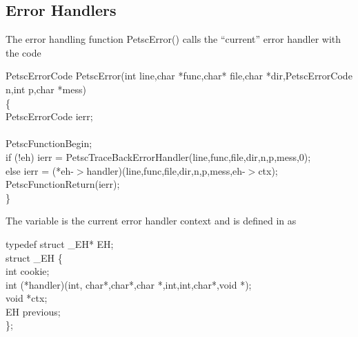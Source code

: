 \documentclass[twoside,12pt]{../sty/report_petsc}
\begin{document}
\subsection{Error Handlers}
The error handling function PetscError() calls the ``current'' error handler
with the code
\begin{tabbing}
PetscErrorCode PetscError(int line,char *func,char* file,char *dir,PetscErrorCode n,int p,char *mess)\\
\{ \\
  PetscErrorCode ierr;\\
\\
  PetscFunctionBegin;\\
  if (!eh)     ierr = PetscTraceBackErrorHandler(line,func,file,dir,n,p,mess,0);\\
  else         ierr = (*eh-$>$handler)(line,func,file,dir,n,p,mess,eh-$>$ctx);\\
  PetscFunctionReturn(ierr);\\
\}
\end{tabbing}
The variable  is the current error handler context and is defined in 
 as
\begin{tabbing}
typedef struct \_EH* EH;\\
struct \_EH \{\\
  int    cookie;\\
  int    (*handler)(int, char*,char*,char *,int,int,char*,void *);\\
  void   *ctx;\\
  EH     previous;\\
\};
\end{tabbing}
\end{document}

